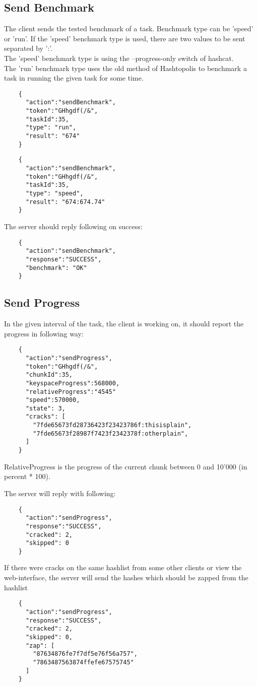 \documentclass{article}
\begin{document}
	\subsection*{Send Benchmark}
	The client sends the tested benchmark of a task. Benchmark type can be 'speed' or 'run'. If the 'speed' benchmark type is used, there are two values to be sent separated by ':'. \\
	The 'speed' benchmark type is using the --progress-only switch of hashcat. \\
	The 'run' benchmark type uses the old method of Hashtopolis to benchmark a task in running the given task for some time.
	\begin{verbatim}
	{
	  "action":"sendBenchmark",
	  "token":"GHhgdf(/&",
	  "taskId":35,
	  "type": "run",
	  "result": "674"
	}
	\end{verbatim}
	\begin{verbatim}
	{
	  "action":"sendBenchmark",
	  "token":"GHhgdf(/&",
	  "taskId":35,
	  "type": "speed",
	  "result": "674:674.74"
	}
	\end{verbatim}
	The server should reply following on success:
	\begin{verbatim}
	{
	  "action":"sendBenchmark",
	  "response":"SUCCESS",
	  "benchmark": "OK"
	}
	\end{verbatim}
	
	
	\subsection*{Send Progress}
	In the given interval of the task, the client is working on, it should report the progress in following way:
	\begin{verbatim}
	{
	  "action":"sendProgress",
	  "token":"GHhgdf(/&",
	  "chunkId":35,
	  "keyspaceProgress":568000,
	  "relativeProgress":"4545"
	  "speed":570000,
	  "state": 3,
	  "cracks": [
	    "7fde65673fd28736423f23423786f:thisisplain",
	    "7fde65673f28987f7423f2342378f:otherplain",
	  ]
	}
	\end{verbatim}
	RelativeProgress is the progress of the current chunk between 0 and 10'000 (in percent * 100).
	
	The server will reply with following:
	\begin{verbatim}
	{
	  "action":"sendProgress",
	  "response":"SUCCESS",
	  "cracked": 2,
	  "skipped": 0
	}
	\end{verbatim}
	If there were cracks on the same hashlist from some other clients or view the web-interface, the server will send the hashes which should be zapped from the hashlist
	\begin{verbatim}
	{
	  "action":"sendProgress",
	  "response":"SUCCESS",
	  "cracked": 2,
	  "skipped": 0,
	  "zap": [
	    "87634876fe7f7df5e76f56a757",
	    "7863487563874ffefe67575745"
	  ]
	}
	\end{verbatim}
\end{document}
